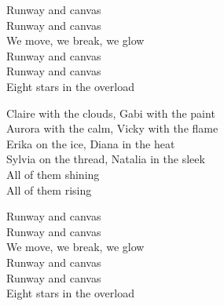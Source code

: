 \begin{lyrics}
Runway and canvas\\
Runway and canvas\\
We move, we break, we glow\\
Runway and canvas\\
Runway and canvas\\
Eight stars in the overload

Claire with the clouds, Gabi with the paint\\
Aurora with the calm, Vicky with the flame\\
Erika on the ice, Diana in the heat\\
Sylvia on the thread, Natalia in the sleek\\
All of them shining\\
All of them rising

Runway and canvas\\
Runway and canvas\\
We move, we break, we glow\\
Runway and canvas\\
Runway and canvas\\
Eight stars in the overload
\end{lyrics}

